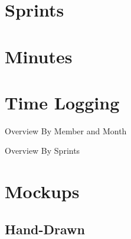 \begin{appendix}

\chapter{Sprints}

\chapter{Minutes}

\chapter{Time Logging}


\begin{table}[htbp]
  \caption{Overview By Member and Month}
  \centering
\end{table}

\begin{landscape}

\DTLsetseparator{,}

  \centering

\begin{table}[htbp]
  \caption{Overview By Sprints}
  \centering
\end{table}

\end{landscape}

\chapter{Mockups}

\section{Hand-Drawn}


\end{appendix}
